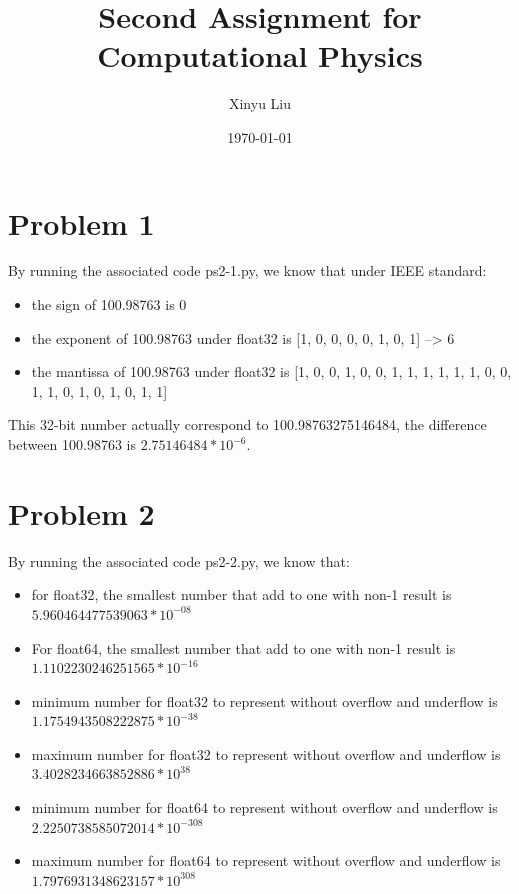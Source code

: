 \documentclass[letterpaper,12pt]{article}
\title{Second Assignment for Computational Physics}
\date{\today}
\author{Xinyu Liu}
\begin{document}
\maketitle
\tableofcontents

\section{Problem 1}

By running the associated code ps2-1.py, we know that under IEEE standard:

\begin{itemize}
    \item the sign of 100.98763 is 0
    \item the exponent of 100.98763 under float32 is [1, 0, 0, 0, 0, 1, 0, 1] --> 6
    \item the mantissa of 100.98763 under float32 is [1, 0, 0, 1, 0, 0, 1, 1, 1, 1, 1, 1, 0, 0, 1, 1, 0, 1, 0, 1, 0, 1, 1]
\end{itemize}

This 32-bit number actually correspond to 100.98763275146484, the difference between 100.98763 is $2.75146484*10^{-6}$.

\section{Problem 2}

By running the associated code ps2-2.py, we know that:

\begin{itemize}
    \item for float32, the smallest number that add to one with non-1 result is $5.960464477539063*10^{-08}$
    \item For float64, the smallest number that add to one with non-1 result is $1.1102230246251565*10^{-16}$
    \item minimum number for float32 to represent without overflow and underflow is $1.1754943508222875*10^{-38}$
    \item maximum number for float32 to represent without overflow and underflow is $3.4028234663852886*10^{38}$
    \item minimum number for float64 to represent without overflow and underflow is $2.2250738585072014*10^{-308}$
    \item maximum number for float64 to represent without overflow and underflow is $1.7976931348623157*10^{308}$
\end{itemize} 
\end{document}
